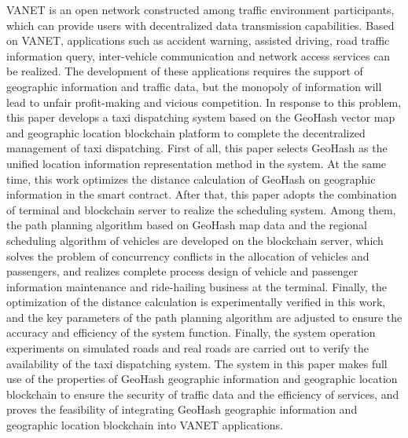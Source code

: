 \begin{englishabstract}

VANET is an open network constructed among traffic environment participants, which can provide users with decentralized data transmission capabilities. Based on VANET, applications such as accident warning, assisted driving, road traffic information query, inter-vehicle communication and network access services can be realized. The development of these applications requires the support of geographic information and traffic data, but the monopoly of information will lead to unfair profit-making and vicious competition. In response to this problem, this paper develops a taxi dispatching system based on the GeoHash vector map and geographic location blockchain platform to complete the decentralized management of taxi dispatching. First of all, this paper selects GeoHash as the unified location information representation method in the system. At the same time, this work optimizes the distance calculation of GeoHash on geographic information in the smart contract. After that, this paper adopts the combination of terminal and blockchain server to realize the scheduling system. Among them, the path planning algorithm based on GeoHash map data and the regional scheduling algorithm of vehicles are developed on the blockchain server, which solves the problem of concurrency conflicts in the allocation of vehicles and passengers, and realizes complete process design of vehicle and passenger information maintenance and ride-hailing business at the terminal. Finally, the optimization of the distance calculation is experimentally verified in this work, and the key parameters of the path planning algorithm are adjusted to ensure the accuracy and efficiency of the system function. Finally, the system operation experiments on simulated roads and real roads are carried out to verify the availability of the taxi dispatching system. The system in this paper makes full use of the properties of GeoHash geographic information and geographic location blockchain to ensure the security of traffic data and the efficiency of services, and proves the feasibility of integrating GeoHash geographic information and geographic location blockchain into VANET applications.


\end{englishabstract}
